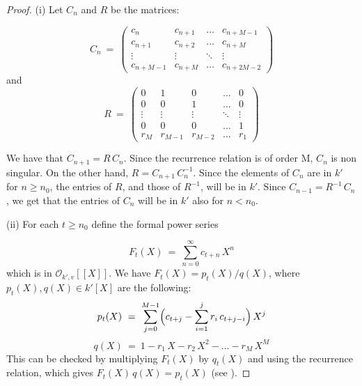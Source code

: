 \begin{proof}

\item{(i)} Let $C_n$ and $R$ be the matrices:

\begin{equation}
C_n\ =
\ \left(
\begin{array}{llll}
              c_n & c_{n+1} & \hdots & c_{n+M-1} \\
              c_{n+1} & c_{n+2} & \hdots  & c_{n+M} \\
              \vdots & \vdots & \ddots & \vdots \\
              c_{n+M-1} & c_{n+M} & \hdots & c_{n+2M-2}
\end{array}
\right)
\end{equation}
and
\begin{equation}
R\ =
\ \left(
\begin{array}{lllll}
              0 & 1 & 0 & \hdots & 0 \\
              0 & 0 & 1 & \hdots & 0 \\
             \vdots & \vdots & \vdots & \ddots & \vdots \\
              0 & 0 & 0 & \hdots & 1 \\
              r_M & r_{M-1} & r_{M-2} & \hdots & r_1 
\end{array}
\right)
\end{equation} 

We have that $C_{n+1} = R\,C_n$. Since the recurrence 
relation is of order M, $C_n$ is non singular. 
On the other hand, $R = C_{n+1}\,C_{n}^{-1}$. Since the 
elements of $C_n$ are in $k'$ for $n \geq n_0$, the entries 
of $R$, and those of $R^{-1}$, will be in $k'$. Since 
$C_{n-1} = R^{-1}\,C_n$, we get that the entries of 
$C_n$ will be in $k'$ also for $n < n_0$. 

\item{(ii)} For each $t \geq n_0$ define the formal 
power series 

\begin{equation}
F_t(X)\ =\ \sum_{n=0}^{\infty} c_{t+n}\,X^n
\end{equation}
which is in $\mathcal O_{k',v}[[X]]$. 
We have $F_t(X) = p_t(X)/q(X)$, 
where $p_t(X),q(X) \in k'[X]$ are the following:
\begin{equation}
p_t(X)\ =\ \sum_{j=0}^{M-1} \Bigl( c_{t+j} - 
                    \sum_{i=1}^{j} r_i\,c_{t+j-i} \Bigr)\,X^j
\end{equation}
\begin{equation}
q(X)\ =\ 1 - r_1\,X - r_2\,X^2 - \dots - r_M\,X^M
\end{equation}
This can be checked by multiplying $F_t(X)$ by $q_t(X)$ 
and using the recurrence relation, which gives 
$F_t(X)\,q(X) = p_t(X)$ (see \cite{poorten:sp}). 


\end{proof}
